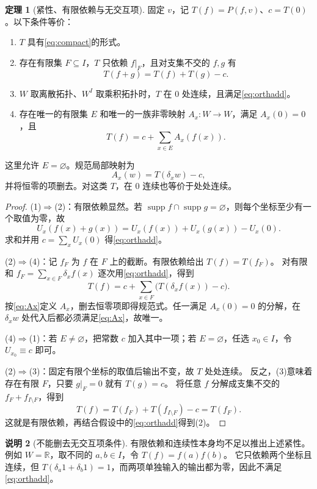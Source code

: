 \documentclass[UTF8,11pt,a4paper]{ctexart}
\theoremstyle{definition}
\newtheorem{theorem}{定理}[section]
\newtheorem{remark}[theorem]{说明}
\newcommand{\R}{\mathbb R}
\newcommand{\supp}{\operatorname{supp}}
\numberwithin{equation}{section}
\begin{document}
\begin{theorem}[紧性、有限依赖与无交互项]\label{thm:compact}
固定 $v$，记 $T(f)=P(f,v)$、$c=T(0)$。以下条件等价：
\begin{enumerate}
\item $T$ 具有\eqref{eq:compact}的形式。
\item 存在有限集 $F\subseteq I$，$T$ 只依赖 $f|_F$，且对支集不交的 $f,g$ 有
\begin{equation}\label{eq:orthadd}
 T(f+g)=T(f)+T(g)-c.
\end{equation}
\item $W$ 取离散拓扑、$W^I$ 取乘积拓扑时，$T$ 在 $0$ 处连续，且满足\eqref{eq:orthadd}。
\item 存在唯一的有限集 $E$ 和唯一的一族非零映射 $A_x:W\to W$，满足 $A_x(0)=0$，且
\begin{equation}\label{eq:canonical}
 T(f)=c+\sum_{x\in E}A_x(f(x)).
\end{equation}
\end{enumerate}
这里允许 $E=\varnothing$。规范局部映射为
\begin{equation}\label{eq:Ax}
 A_x(w)=T(\delta_xw)-c,
\end{equation}
并将恒零的项删去。对这类 $T$，在 $0$ 连续也等价于处处连续。
\end{theorem}
\begin{proof}
(1)$\Rightarrow$(2)：有限依赖显然。若 $\supp f\cap\supp g=\varnothing$，则每个坐标至少有一个取值为零，故
\[
 U_x(f(x)+g(x))=U_x(f(x))+U_x(g(x))-U_x(0).
\]
求和并用 $c=\sum_xU_x(0)$ 得\eqref{eq:orthadd}。

(2)$\Rightarrow$(4)：记 $f_F$ 为 $f$ 在 $F$ 上的截断。有限依赖给出 $T(f)=T(f_F)$。
对有限和 $f_F=\sum_{x\in F}\delta_xf(x)$ 逐次用\eqref{eq:orthadd}，得到
\[
 T(f)=c+\sum_{x\in F}\bigl(T(\delta_xf(x))-c\bigr).
\]
按\eqref{eq:Ax}定义 $A_x$，删去恒零项即得规范式。任一满足 $A_x(0)=0$ 的分解，在 $\delta_xw$ 处代入后都必须满足\eqref{eq:Ax}，故唯一。

(4)$\Rightarrow$(1)：若 $E\ne\varnothing$，把常数 $c$ 加入其中一项；若 $E=\varnothing$，任选 $x_0\in I$，令 $U_{x_0}\equiv c$ 即可。

(2)$\Rightarrow$(3)：固定有限个坐标的取值后输出不变，故 $T$ 处处连续。
反之，(3)意味着存在有限 $F$，只要 $g|_F=0$ 就有 $T(g)=c$。
将任意 $f$ 分解成支集不交的 $f_F+f_{I\setminus F}$，得到
\[
 T(f)=T(f_F)+T(f_{I\setminus F})-c=T(f_F).
\]
这就是有限依赖，再结合假设中的\eqref{eq:orthadd}得到(2)。
\end{proof}

\begin{remark}[不能删去无交互项条件]
有限依赖和连续性本身均不足以推出上述紧性。
例如 $W=\R$，取不同的 $a,b\in I$，令 $T(f)=f(a)f(b)$。
它只依赖两个坐标且连续，但
$T(\delta_a1+\delta_b1)=1$，而两项单独输入的输出都为零，因此不满足\eqref{eq:orthadd}。
\end{remark}
\end{document}
